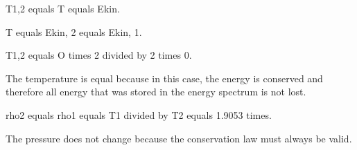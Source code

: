 T1,2 equals T equals Ekin. 

T equals Ekin, 2 equals Ekin, 1. 

T1,2 equals O times 2 divided by 2 times 0. 

The temperature is equal because in this case, the energy is conserved and therefore all energy that was stored in the energy spectrum is not lost. 

rho2 equals rho1 equals T1 divided by T2 equals 1.9053 times. 

The pressure does not change because the conservation law must always be valid.